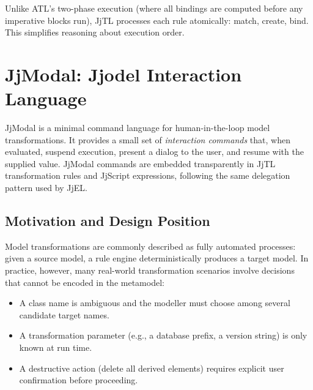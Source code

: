 \documentclass[11pt,a4paper]{article}
\newcommand{\jjmodal}{\textsf{JjModal}}
\newcommand{\jjel}{\textsf{JjEL}}
\newcommand{\jjtl}{\textsf{JjTL}}
\begin{document}
Unlike ATL's two-phase execution (where all bindings are computed before any imperative blocks run), \jjtl{} processes each rule atomically: match, create, bind. This simplifies reasoning about execution order.

 
\section{JjModal: Jjodel Interaction Language}\label{sec:jjmodal}
 
\jjmodal{} is a minimal command language for human-in-the-loop model
transformations. It provides a small set of \emph{interaction commands}
that, when evaluated, suspend execution, present a dialog to the user,
and resume with the supplied value. \jjmodal{} commands are embedded
transparently in \jjtl{} transformation rules and \textsf{JjScript}
expressions, following the same delegation pattern used by \jjel{}.
 
\subsection{Motivation and Design Position}
 
Model transformations are commonly described as fully automated processes:
given a source model, a rule engine deterministically produces a target
model. In practice, however, many real-world transformation scenarios
involve decisions that cannot be encoded in the metamodel:
 
\begin{itemize}
    \item A class name is ambiguous and the modeller must choose among
          several candidate target names.
    \item A transformation parameter (e.g., a database prefix, a version
          string) is only known at run time.
    \item A destructive action (delete all derived elements) requires
          explicit user confirmation before proceeding.
\end{itemize}
 
\end{document}
